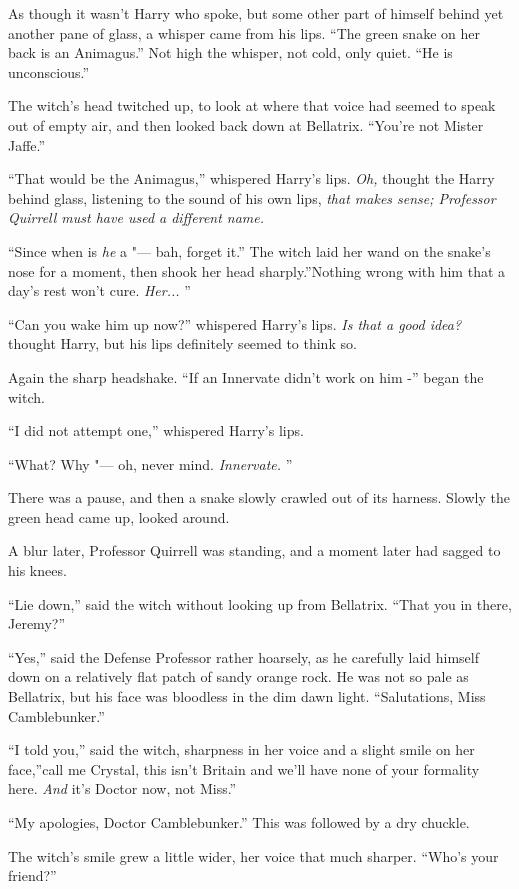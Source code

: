 As though it wasn't Harry who spoke, but some other part of himself
behind yet another pane of glass, a whisper came from his lips. ``The
green snake on her back is an Animagus.'' Not high the whisper, not
cold, only quiet. ``He is unconscious.''

The witch's head twitched up, to look at where that voice had seemed to
speak out of empty air, and then looked back down at Bellatrix. ``You're
not Mister Jaffe.''

``That would be the Animagus,'' whispered Harry's lips. \emph{Oh,}
thought the Harry behind glass, listening to the sound of his own lips,
\emph{that makes sense; Professor Quirrell must have used a different
name.}

``Since when is \emph{he} a "--- bah, forget it.'' The witch laid her wand
on the snake's nose for a moment, then shook her head sharply.''Nothing
wrong with him that a day's rest won't cure. \emph{Her...} ''

``Can you wake him up now?'' whispered Harry's lips. \emph{Is that a
good idea?} thought Harry, but his lips definitely seemed to think so.

Again the sharp headshake. ``If an Innervate didn't work on him -''
began the witch.

``I did not attempt one,'' whispered Harry's lips.

``What? Why "--- oh, never mind. \emph{Innervate.} ''

There was a pause, and then a snake slowly crawled out of its harness.
Slowly the green head came up, looked around.

A blur later, Professor Quirrell was standing, and a moment later had
sagged to his knees.

``Lie down,'' said the witch without looking up from Bellatrix. ``That
you in there, Jeremy?''

``Yes,'' said the Defense Professor rather hoarsely, as he carefully
laid himself down on a relatively flat patch of sandy orange rock. He
was not so pale as Bellatrix, but his face was bloodless in the dim dawn
light. ``Salutations, Miss Camblebunker.''

``I told you,'' said the witch, sharpness in her voice and a slight
smile on her face,''call me Crystal, this isn't Britain and we'll have
none of your formality here. \emph{And} it's Doctor now, not Miss.''

``My apologies, Doctor Camblebunker.'' This was followed by a dry
chuckle.

The witch's smile grew a little wider, her voice that much sharper.
``Who's your friend?''

